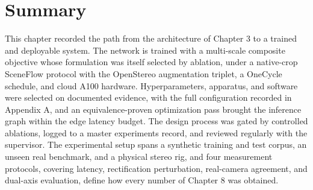 \section{Summary}
This chapter recorded the path from the architecture of Chapter 3 to a
trained and deployable system. The network is trained with a multi-scale
composite objective whose formulation was itself selected by ablation,
under a native-crop SceneFlow protocol with the OpenStereo augmentation
triplet, a OneCycle schedule, and cloud A100 hardware. Hyperparameters,
apparatus, and software were selected on documented evidence, with the
full configuration recorded in Appendix A, and an equivalence-proven
optimization pass brought the inference graph within the edge latency
budget. The design process was gated by controlled ablations, logged to a
master experiments record, and reviewed regularly with the supervisor.
The experimental setup spans a synthetic training and test corpus, an
unseen real benchmark, and a physical stereo rig, and four measurement
protocols, covering latency, rectification perturbation, real-camera
agreement, and dual-axis evaluation, define how every number of Chapter 8
was obtained.
